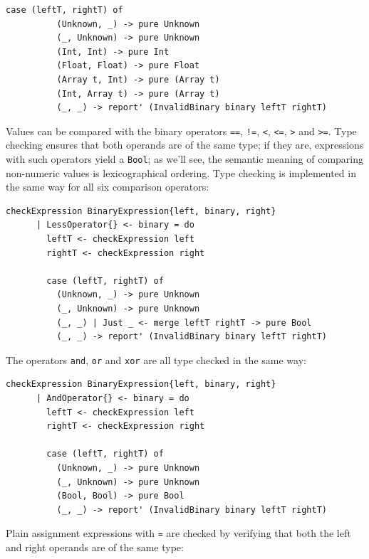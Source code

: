 \documentclass[UdineBachThesis,american,11pt]{PhdThesis}
\begin{document}
  \pagebreak

  \begin{Verbatim}[gobble=4,fontsize=\small]
        case (leftT, rightT) of
          (Unknown, _) -> pure Unknown
          (_, Unknown) -> pure Unknown
          (Int, Int) -> pure Int
          (Float, Float) -> pure Float
          (Array t, Int) -> pure (Array t)
          (Int, Array t) -> pure (Array t)
          (_, _) -> report' (InvalidBinary binary leftT rightT)
  \end{Verbatim}

  Values can be compared with the binary operators \mbox{\texttt{==}},
  \mbox{\texttt{!=}}, \texttt{<}, \mbox{\texttt{<=}}, \texttt{>} and
  \mbox{\texttt{>=}}. Type checking ensures that both operands are of the same
  type; if they are, expressions with such operators yield a
  \mbox{\texttt{Bool}}; as we'll see, the semantic meaning of comparing
  non-numeric values is lexicographical ordering. Type checking is implemented
  in the same way for all six comparison operators:

  \begin{Verbatim}[gobble=4,fontsize=\small]
    checkExpression BinaryExpression{left, binary, right}
      | LessOperator{} <- binary = do
        leftT <- checkExpression left
        rightT <- checkExpression right

        case (leftT, rightT) of
          (Unknown, _) -> pure Unknown
          (_, Unknown) -> pure Unknown
          (_, _) | Just _ <- merge leftT rightT -> pure Bool
          (_, _) -> report' (InvalidBinary binary leftT rightT)
  \end{Verbatim}

  The operators \mbox{\texttt{and}}, \mbox{\texttt{or}} and \mbox{\texttt{xor}}
  are all type checked in the same way:

  \begin{Verbatim}[gobble=4,fontsize=\small]
    checkExpression BinaryExpression{left, binary, right}
      | AndOperator{} <- binary = do
        leftT <- checkExpression left
        rightT <- checkExpression right

        case (leftT, rightT) of
          (Unknown, _) -> pure Unknown
          (_, Unknown) -> pure Unknown
          (Bool, Bool) -> pure Bool
          (_, _) -> report' (InvalidBinary binary leftT rightT)
  \end{Verbatim}

  Plain assignment expressions with \texttt{=} are checked by verifying that
  both the left and right operands are of the same type:
\end{document}
